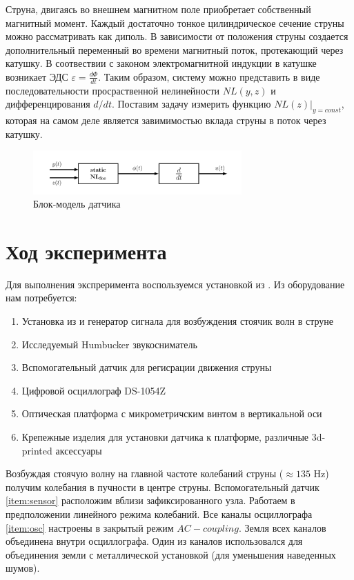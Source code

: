 \documentclass{article}
\begin{document}
Струна, двигаясь во внешнем магнитном поле приобретает собственный магнитный момент.
Каждый достаточно тонкое цилиндрическое сечение струны можно рассматривать как диполь. В зависимости от положения струны
создается дополнительный переменный во времени магнитный поток, протекающий через катушку. В соотвествии с законом
электромагнитной индукции в катушке возникает ЭДС $\varepsilon = \frac{d\Phi}{dt}$. Таким образом, систему можно
представить в виде последовательности просраственной нелинейности $NL(y, z)$ и дифференцирования $d/dt$. Поставим задачу
измерить функцию $NL(z)\vert_{y = const}$, которая на самом деле является завимимостью вклада струны в поток через катушку.

\begin{figure}[h]
    \centering
    \includegraphics[width=8cm]{drawings/model.png}
    \caption{Блок-модель датчика}
    \label{fig:model}
\end{figure}

\section{Ход эксперимента}

Для выполнения экспреримента воспользуемся установкой из \cite{string-lab}. Из оборудование нам потребуется:

\begin{enumerate}
    \item Установка из \cite{string-lab} и генератор сигнала для возбуждения стоячик волн в струне \label{item:generator}
    \item Исследуемый Humbucker звукосниматель
    \item Вспомогательный датчик для регисрации движения струны \label{item:sensor}
    \item Цифровой осциллограф DS-1054Z \label{item:osc}
    \item Оптическая платформа с микрометричским винтом в вертикальной оси
    \item Крепежные изделия для установки датчика к платформе, различные 3d-printed аксессуары
\end{enumerate}

Возбуждая стоячую волну на главной частоте колебаний струны ($\approx 135$ Hz) получим колебания в пучности в центре струны.
Вспомогательный датчик \ref{item:sensor} расположим вблизи зафиксированного узла. Работаем в предположении линейного режима
колебаний. Все каналы осциллографа \ref{item:osc} настроены в закрытый режим $AC-coupling$. Земля всех каналов объединена внутри
осциллографа. Один из каналов использовался для объединения земли с металлической установкой (для уменьшения наведенных шумов).
\end{document}
